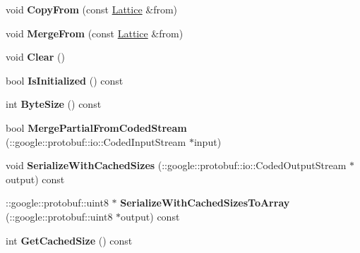 \begin{DoxyCompactItemize}
\item 
\hypertarget{classlattice_1_1Lattice_a06293cf4a975500085cb11ff59418655}{
void {\bfseries CopyFrom} (const \hyperlink{classlattice_1_1Lattice}{Lattice} \&from)}
\label{classlattice_1_1Lattice_a06293cf4a975500085cb11ff59418655}

\item 
\hypertarget{classlattice_1_1Lattice_afcab65a875a55ec9f5ebc88f2b22a662}{
void {\bfseries MergeFrom} (const \hyperlink{classlattice_1_1Lattice}{Lattice} \&from)}
\label{classlattice_1_1Lattice_afcab65a875a55ec9f5ebc88f2b22a662}

\item 
\hypertarget{classlattice_1_1Lattice_a69643c6d759f3c59ca72f0b640e744cf}{
void {\bfseries Clear} ()}
\label{classlattice_1_1Lattice_a69643c6d759f3c59ca72f0b640e744cf}

\item 
\hypertarget{classlattice_1_1Lattice_a2a517e87a5ff555951149bd6c8f2fcc0}{
bool {\bfseries IsInitialized} () const }
\label{classlattice_1_1Lattice_a2a517e87a5ff555951149bd6c8f2fcc0}

\item 
\hypertarget{classlattice_1_1Lattice_aa1fa86cdd3f0897665f5a69c299ce120}{
int {\bfseries ByteSize} () const }
\label{classlattice_1_1Lattice_aa1fa86cdd3f0897665f5a69c299ce120}

\item 
\hypertarget{classlattice_1_1Lattice_a13776f9114d9135033c6a7ef0e5aa855}{
bool {\bfseries MergePartialFromCodedStream} (::google::protobuf::io::CodedInputStream $\ast$input)}
\label{classlattice_1_1Lattice_a13776f9114d9135033c6a7ef0e5aa855}

\item 
\hypertarget{classlattice_1_1Lattice_a211943e304584090a05bff477ba64bf3}{
void {\bfseries SerializeWithCachedSizes} (::google::protobuf::io::CodedOutputStream $\ast$output) const }
\label{classlattice_1_1Lattice_a211943e304584090a05bff477ba64bf3}

\item 
\hypertarget{classlattice_1_1Lattice_a65ac53068ee3509d044738ee4e4625ae}{
::google::protobuf::uint8 $\ast$ {\bfseries SerializeWithCachedSizesToArray} (::google::protobuf::uint8 $\ast$output) const }
\label{classlattice_1_1Lattice_a65ac53068ee3509d044738ee4e4625ae}

\item 
\hypertarget{classlattice_1_1Lattice_a93bab06ef91469b47be8794cacd5a5f7}{
int {\bfseries GetCachedSize} () const }
\label{classlattice_1_1Lattice_a93bab06ef91469b47be8794cacd5a5f7}


\end{DoxyCompactItemize}

